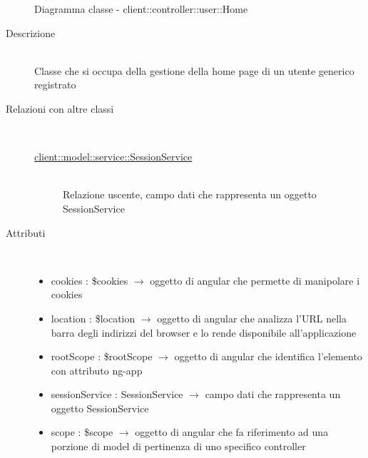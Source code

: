 \vspace{0.5cm}
\hypertarget{client::controller::user::Home}{}
\begin{figure}[H]
	\centering
	\caption{Diagramma classe - client::controller::user::Home}
\end{figure}\begin{description}
\item[Descrizione] \hfill \\
Classe che si occupa della gestione della home page di un utente generico registrato
\item[Relazioni con altre classi] \hfill \\
\vspace{-7mm}
\begin{description}
	\item[\hyperlink{client::model::service::SessionService}{client::model::service::SessionService}] \hfill \\
	Relazione uscente, campo dati che rappresenta un oggetto SessionService
\end{description}

\item[Attributi] \hfill \\
\vspace{-7mm}
\begin{itemize}
	\item cookies : \$cookies $\rightarrow$ oggetto di angular che permette di manipolare i cookies
	\item location : \$location $\rightarrow$ oggetto di angular che analizza l'URL nella barra degli indirizzi del browser e lo rende disponibile all'applicazione
	\item rootScope : \$rootScope $\rightarrow$ oggetto di angular che identifica l’elemento con attributo ng-app
	\item sessionService : SessionService $\rightarrow$ campo dati che rappresenta un oggetto SessionService
	\item scope : \$scope $\rightarrow$ oggetto di angular che fa riferimento ad una porzione di model di pertinenza di uno specifico controller
\end{itemize}


\end{description}
